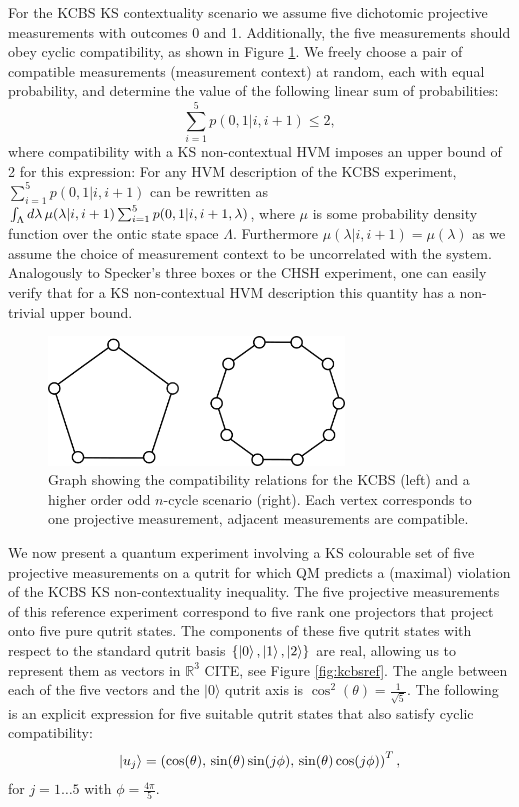 For the KCBS KS contextuality scenario we assume five dichotomic projective measurements with outcomes 0 and 1. Additionally, the five measurements should obey cyclic compatibility, as shown in Figure \ref{fig:kcbscompat}. We freely choose a pair of compatible measurements (measurement context) at random, each with equal probability, and determine the value of the following linear sum of probabilities:
\begin{equation}
    \sum_{i=1}^5 p(0,1\vert i, i+1)\leq 2,
\end{equation}
where compatibility with a KS non-contextual HVM imposes an upper bound of 2 for this expression: For any HVM description of the KCBS experiment, $\sum_{i=1}^5 p(0,1\vert i,i+1)$ can be rewritten as $\int_{\Lambda}d\lambda\thinspace\mu(\lambda\vert i,i+1)\sum_{i=1}^5 p(0,1\vert i, i+1, \lambda)$, where $\mu$ is some probability density function over the ontic state space $\Lambda$. Furthermore $\mu(\lambda\vert i,i+1)=\mu(\lambda)$ as we assume the choice of measurement context to be uncorrelated with the system. Analogously to Specker's three boxes or the CHSH experiment, one can easily verify that for a KS non-contextual HVM description this quantity has a non-trivial upper bound. 

\begin{figure}
    \centering
    \includegraphics[width=0.7\textwidth]{images/kcbscompat.png}
    \caption{Graph showing the compatibility relations for the KCBS (left) and a higher order odd $n$-cycle scenario (right). Each vertex corresponds to one projective measurement, adjacent measurements are compatible.}
    \label{fig:kcbscompat}
\end{figure}

We now present a quantum experiment involving a KS colourable set of five projective measurements on a qutrit for which QM predicts a (maximal) violation of the KCBS KS non-contextuality inequality. The five projective measurements of this reference experiment correspond to five rank one projectors that project onto five pure qutrit states. The components of these five qutrit states with respect to the standard qutrit basis $\{\ket{0}, \ket{1}, \ket{2}\}$ are real, allowing us to represent them as vectors in $\mathbb{R}^3$ CITE, see Figure \ref{fig:kcbsref}. The angle between each of the five vectors and the $\vert 0\rangle$ qutrit axis is $\cos^2(\theta)=\frac{1}{\sqrt{5}}$. The following is an explicit expression for five suitable qutrit states that also satisfy cyclic compatibility:
\begin{align}
    \ket{u_j} = \left(\cos(\theta),\thinspace\sin(\theta)\sin(j\phi),\thinspace\sin(\theta)\cos(j\phi)\right)^T,
\end{align}
for $\displaystyle j=1\dots 5$ with $\displaystyle\phi=\frac{4\pi}{5}$.

